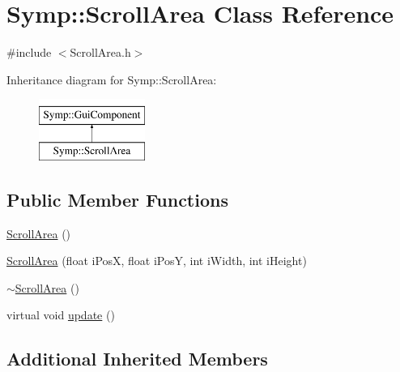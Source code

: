 \hypertarget{class_symp_1_1_scroll_area}{\section{Symp\-:\-:Scroll\-Area Class Reference}
\label{class_symp_1_1_scroll_area}
}


{\ttfamily \#include $<$Scroll\-Area.\-h$>$}

Inheritance diagram for Symp\-:\-:Scroll\-Area\-:\begin{figure}[H]
\begin{center}
\leavevmode
\includegraphics[height=2.000000cm]{class_symp_1_1_scroll_area}
\end{center}
\end{figure}
\subsection*{Public Member Functions}
\begin{DoxyCompactItemize}
\item 
\hyperlink{class_symp_1_1_scroll_area_ac6739b730ec0358cbb2feceb1c2f2dcf}{Scroll\-Area} ()
\item 
\hyperlink{class_symp_1_1_scroll_area_a42842f32256e6e2abd8008711028f039}{Scroll\-Area} (float i\-Pos\-X, float i\-Pos\-Y, int i\-Width, int i\-Height)
\item 
\hyperlink{class_symp_1_1_scroll_area_ab76e85e7c6888f1a319f87d7c5b83f9d}{$\sim$\-Scroll\-Area} ()
\item 
virtual void \hyperlink{class_symp_1_1_scroll_area_a9183e9193ecfa8a2d9fda6ff4d706680}{update} ()
\end{DoxyCompactItemize}
\subsection*{Additional Inherited Members}


